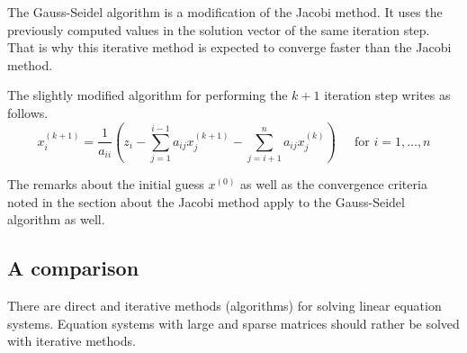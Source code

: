 The Gauss-Seidel algorithm is a modification of the Jacobi method.  It
uses the previously computed values in the solution vector of the same
iteration step.  That is why this iterative method is expected to
converge faster than the Jacobi method.

\addvspace{12pt}

The slightly modified algorithm for performing the $k + 1$ iteration
step writes as follows.
\begin{equation}
x_{i}^{(k+1)} = \dfrac{1}{a_{ii}}\left(z_i - \sum_{j=1}^{i-1} a_{ij}x_{j}^{(k+1)} - \sum_{j=i+1}^{n} a_{ij}x_{j}^{(k)}\right)
\;\;\;\; \textrm{ for } i = 1, \ldots, n
\end{equation}

The remarks about the initial guess $x^{(0)}$ as well as the
convergence criteria noted in the section about the Jacobi method
apply to the Gauss-Seidel algorithm as well.

\subsection{A comparison}

There are direct and iterative methods (algorithms) for solving linear
equation systems.  Equation systems with large and sparse matrices
should rather be solved with iterative methods.

\addvspace{12pt}

